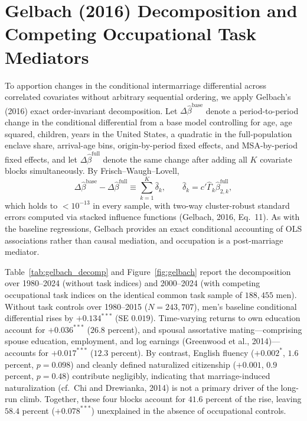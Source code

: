 \documentclass[11pt]{article}
\begin{document}
\section{Gelbach (2016) Decomposition and Competing Occupational Task Mediators}
To apportion changes in the conditional intermarriage differential across correlated covariates without arbitrary sequential ordering, we apply Gelbach's (2016) exact order-invariant decomposition. Let $\Delta\hat{\beta}^{\text{base}}$ denote a period-to-period change in the conditional differential from a base model controlling for age, age squared, children, years in the United States, a quadratic in the full-population enclave share, arrival-age bins, origin-by-period fixed effects, and MSA-by-period fixed effects, and let $\Delta\hat{\beta}^{\text{full}}$ denote the same change after adding all $K$ covariate blocks simultaneously. By Frisch--Waugh--Lovell,
\begin{equation}
\Delta\hat{\beta}^{\text{base}} - \Delta\hat{\beta}^{\text{full}} \equiv \sum_{k=1}^{K} \hat{\delta}_k, \qquad \hat{\delta}_k = c'\hat{\Gamma}_k \hat{\beta}_{2,k}^{\text{full}},
\end{equation}
which holds to $<10^{-13}$ in every sample, with two-way cluster-robust standard errors computed via stacked influence functions (Gelbach, 2016, Eq.~11). As with the baseline regressions, Gelbach provides an exact conditional accounting of OLS associations rather than causal mediation, and occupation is a post-marriage mediator.



Table~\ref{tab:gelbach_decomp} and Figure~\ref{fig:gelbach} report the decomposition over 1980--2024 (without task indices) and 2000--2024 (with competing occupational task indices on the identical common task sample of $188{,}455$ men). Without task controls over 1980--2015 ($N = 243{,}707$), men's baseline conditional differential rises by $+0.134^{***}$ (SE $0.019$). Time-varying returns to own education account for $+0.036^{***}$ ($26.8$ percent), and spousal assortative mating---comprising spouse education, employment, and log earnings (Greenwood et al., 2014)---accounts for $+0.017^{***}$ ($12.3$ percent). By contrast, English fluency ($+0.002^{*}$, $1.6$ percent, $p = 0.098$) and cleanly defined naturalized citizenship ($+0.001$, $0.9$ percent, $p = 0.48$) contribute negligibly, indicating that marriage-induced naturalization (cf.\ Chi and Drewianka, 2014) is not a primary driver of the long-run climb. Together, these four blocks account for $41.6$ percent of the rise, leaving $58.4$ percent ($+0.078^{***}$) unexplained in the absence of occupational controls.
\end{document}

